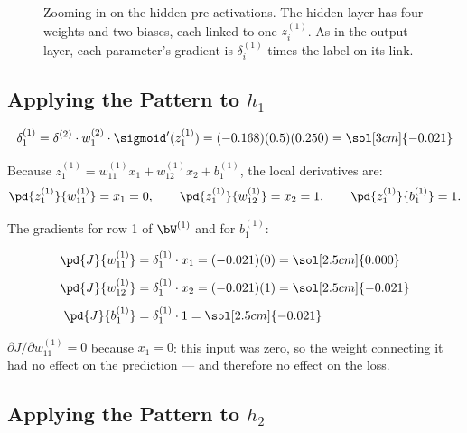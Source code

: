 \documentclass[12pt, a4paper]{article}
\begin{document}
\begin{figure}[H]
  \caption{Zooming in on the hidden pre-activations.  The hidden layer has
    four weights and two biases, each linked to one $z^{(1)}_i$.  As in the
    output layer, each parameter's gradient is $\delta^{(1)}_i$ times the
    label on its link.}
  \label{fig:hidden-local}
\end{figure}

\subsection{Applying the Pattern to $h_1$}

\[
  \delta^{(1)}_1
  = \delta^{(2)} \cdot w^{(2)}_1 \cdot \sigmoid'(z^{(1)}_1)
  = (-0.168)(0.5)(0.250)
  = \sol[3cm]{-0.021}
\]

Because $z^{(1)}_1 = w^{(1)}_{11} x_1 + w^{(1)}_{12} x_2 + b^{(1)}_1$,
the local derivatives are:
\[
  \pd{z^{(1)}_1}{w^{(1)}_{11}} = x_1 = 0, \qquad
  \pd{z^{(1)}_1}{w^{(1)}_{12}} = x_2 = 1, \qquad
  \pd{z^{(1)}_1}{b^{(1)}_1} = 1.
\]

The gradients for row 1 of $\bW^{(1)}$ and for $b^{(1)}_1$:

\begin{align*}
  \pd{J}{w^{(1)}_{11}} & = \delta^{(1)}_1 \cdot x_1 = (-0.021)(0) = \sol[2.5cm]{0.000}  \\[4pt]
  \pd{J}{w^{(1)}_{12}} & = \delta^{(1)}_1 \cdot x_2 = (-0.021)(1) = \sol[2.5cm]{-0.021} \\[4pt]
  \pd{J}{b^{(1)}_1}    & = \delta^{(1)}_1 \cdot 1 = \sol[2.5cm]{-0.021}
\end{align*}

\begin{notebox}
  $\partial J / \partial w^{(1)}_{11} = 0$ because $x_1 = 0$: this input was
  zero, so the weight connecting it had no effect on the prediction --- and
  therefore no effect on the loss.
\end{notebox}

\subsection{Applying the Pattern to $h_2$}
\end{document}
